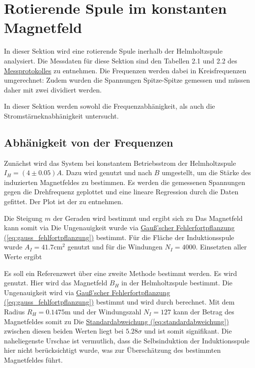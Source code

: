 \newpage

\section{Rotierende Spule im konstanten Magnetfeld}
\label{sec:A1}
In dieser Sektion wird eine rotierende Spule inerhalb der Helmholtzspule analysiert. Die Messdaten für diese Sektion sind den Tabellen 2.1 und 2.2 des \hyperref[ch:Protokoll]{Messprotokolles} zu entnehmen.
Die Frequenzen werden dabei in Kreisfrequenzen umgerechnet:
Zudem wurden die Spannungen Spitze-Spitze gemessen und müssen daher mit zwei dividiert werden.

In dieser Sektion werden sowohl die Frequenzabhänigkeit, als auch die Stromstärneknabhänigkeit untersucht.

\subsection{Abhänigkeit von der Frequenzen}
Zunächst wird das System bei konstantem Betriebsstrom der Helmholtzspule $I_H = (4 \pm 0.05) A$. Dazu wird  genutzt und nach $B$ umgestellt, um die Stärke des induzierten Magnetfeldes zu bestimmen. 
Es werden die gemessenen Spannungen gegen die Drehfrequenz geplottet und eine lineare Regression durch die Daten gefittet. Der Plot ist der  zu entnehmen.

Die Steigung $m$ der Geraden wird bestimmt und ergibt sich zu
Das Magnetfeld kann somit via
Die Ungenauigkeit wurde via \hyperref[eq:gauss_fehlfortpflanzung]{Gauß'scher Fehlerfortpflanzung (\ref*{eq:gauss_fehlfortpflanzung})} bestimmt. Für die Fläche der Induktionsspule wurde $A_I = 41.7 \mathrm{cm^2}$ genutzt und für die Windungen $N_I = 4000$.
Einsetzten aller Werte ergibt

Es soll ein Referenzwert über eine zweite Methode bestimmt werden. Es wird  genutzt. Hier wird das Magnetfeld $B_H$ in der Helmholtzspule bestimmt. Die Ungenauigkeit wird via \hyperref[eq:gauss_fehlfortpflanzung]{Gauß'scher Fehlerfortpflanzung (\ref*{eq:gauss_fehlfortpflanzung})} bestimmt und wird durch
berechnet. Mit dem Radius $R_H = 0.1475$m und der Windungszahl $N_I = 127$ kann der Betrag des Magnetfeldes somit zu
Die \hyperref[eq:standardabweichung]{Standardabweichung (\ref*{eq:standardabweichung})} zwischen diesen beiden Werten liegt bei $5.28\sigma$ und ist somit signifikant.
Die naheliegenste Urschae ist vermutlich, dass die Selbsinduktion der Induktionsspule hier nicht berücksichtigt wurde, was zur Überschätzung des bestimmten Magnetfeldes führt.

